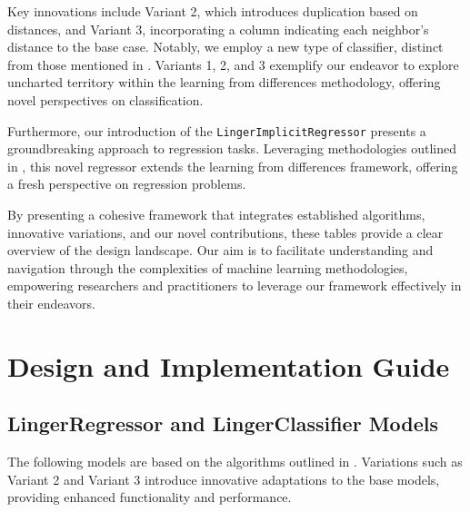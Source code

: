 \documentclass[a4paper, 12pt]{report}
\begin{document}
Key innovations include Variant 2, which introduces duplication based on distances, and Variant 3, incorporating a column indicating each neighbor's distance to the base case. 
Notably, we employ a new type of classifier, distinct from those mentioned in \cite{learningFromDifferences2022}. 
Variants 1, 2, and 3 exemplify our endeavor to explore uncharted territory within the learning from differences methodology, offering novel perspectives on classification.

Furthermore, our introduction of the \texttt{LingerImplicitRegressor} presents a groundbreaking approach to regression tasks. 
Leveraging methodologies outlined in \cite{ye2021learning}, this novel regressor extends the learning from differences framework, 
offering a fresh perspective on regression problems.

By presenting a cohesive framework that integrates established algorithms, innovative variations, and our novel contributions, these tables 
provide a clear overview of the design landscape. Our aim is to facilitate understanding and navigation through the complexities of machine learning methodologies, 
empowering researchers and practitioners to leverage our framework effectively in their endeavors.

\section{Design and Implementation Guide}
\subsection{LingerRegressor and LingerClassifier Models}
The following models are based on the algorithms outlined in \cite{learningFromDifferences2022}. 
Variations such as Variant 2 and Variant 3 introduce innovative adaptations to the base models, 
providing enhanced functionality and performance.
\end{document}
